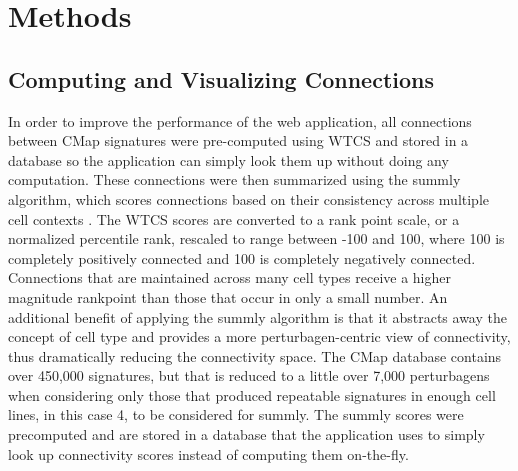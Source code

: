 \documentclass[12pt]{article}
\begin{document}



\section{Methods}
\subsection{Computing and Visualizing Connections}

In order to improve the performance of the web application, all connections between CMap signatures were pre-computed using WTCS and stored in a database so the application can simply look them up without doing any computation. These connections were then summarized using the summly algorithm, which scores connections based on their consistency across multiple cell contexts \cite{subramanian_summly}. The WTCS scores are converted to a rank point scale, or a normalized percentile rank, rescaled to range between -100 and 100, where 100 is completely positively connected and 100 is completely negatively connected. Connections that are maintained across many cell types receive a higher magnitude rankpoint than those that occur in only a small number. An additional benefit of applying the summly algorithm is that it abstracts away the concept of cell type and provides a more perturbagen-centric view of connectivity, thus dramatically reducing the connectivity space. The CMap database contains over 450,000 signatures, but that is reduced to a little over 7,000 perturbagens when considering only those that produced repeatable signatures in enough cell lines, in this case 4, to be considered for summly. The summly scores were precomputed and are stored in a database that the application uses to simply look up connectivity scores instead of computing them on-the-fly. 
\end{document}
